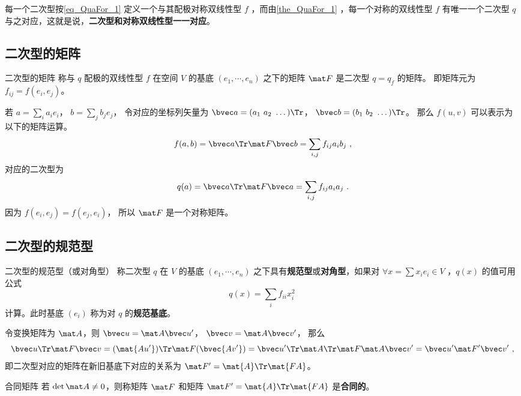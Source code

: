 每一个二次型按\autoref{eq_QuaFor_1} 定义一个与其配极对称双线性型 $f$ ，而由\autoref{the_QuaFor_1} ，每一个对称的双线性型 $f$ 有唯一一个二次型 $q$ 与之对应，这就是说，\textbf{二次型和对称双线性型一一对应}。

\subsection{二次型的矩阵}
\begin{definition}{二次型的矩阵}
称与 $q$ 配极的双线性型 $f$ 在空间 $V$ 的基底 $(e_1,\cdots,e_n)$ 之下的矩阵 $\mat F$ 是二次型 $q=q_f$ 的矩阵。 即矩阵元为 $f_{ij} = f(e_i, e_j)$。
\end{definition}

若 $a = \sum_i a_i e_i$， $b = \sum_j b_j e_j$， 令对应的坐标列矢量为 $\bvec a = (a_1\ a_2\ \dots)\Tr$， $\bvec b = (b_1\ b_2\ \dots)\Tr$。 那么 $f(u, v)$ 可以表示为以下的矩阵运算。
\begin{equation}
f(a, b) = \bvec a\Tr \mat F \bvec b = \sum_{i,j} f_{ij}a_i b_j~,
\end{equation}
对应的二次型为
\begin{equation}
q(a) = \bvec a\Tr \mat F \bvec a = \sum_{i,j} f_{ij}a_i a_j~.
\end{equation}
因为 $f(e_i, e_j) = f(e_j, e_i)$， 所以 $\mat F$ 是一个对称矩阵。

\subsection{二次型的规范型}
\begin{definition}{二次型的规范型（或对角型）}\label{def_QuaFor_1}
称二次型 $q$ 在 $V$ 的基底 $(e_1,\cdots,e_n)$ 之下具有\textbf{规范型}或\textbf{对角型}，如果对 $\forall x=\sum x_i e_i\in V$ ，$q(x)$ 的值可用公式
\begin{equation}
q(x)=\sum_{i}f_{ii}x_i^2~
\end{equation}
计算。此时基底 $(e_i)$ 称为对 $q$ 的\textbf{规范基底}。
\end{definition}

令变换矩阵为 $\mat A$，则 $\bvec u = \mat A \bvec u'$， $\bvec v = \mat A \bvec v'$， 那么
\begin{equation}
\bvec u\Tr \mat F \bvec v = (\mat {Au'})\Tr \mat F (\bvec {Av'}) = {\bvec u'}\Tr \mat A\Tr\mat F \mat A \bvec v'=\bvec u'\mat F' \bvec v'~,
\end{equation}
即二次型对应的矩阵在新旧基底下对应的关系为 $\mat F'=\mat{A}\Tr \mat{FA}$。
\begin{definition}{合同矩阵}
若 $\det \mat A\neq 0$，则称矩阵 $\mat F$ 和矩阵 $\mat F'=\mat{A}\Tr \mat{FA}$ 是\textbf{合同的}。
\end{definition}
